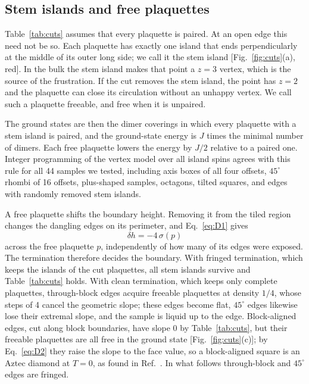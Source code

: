 \documentclass[reprint,aps,prb,floatfix,longbibliography,amsmath,amssymb]{revtex4-2}
\begin{document}
\subsection{Stem islands and free plaquettes}

Table~\ref{tab:cuts} assumes that every plaquette is paired. At an open edge this need not be so. Each plaquette has exactly one island that ends perpendicularly at the middle of its outer long side; we call it the stem island [Fig.~\ref{fig:cuts}(a), red]. In the bulk the stem island makes that point a $z=3$ vertex, which is the source of the frustration. If the cut removes the stem island, the point has $z=2$ and the plaquette can close its circulation without an unhappy vertex. We call such a plaquette freeable, and free when it is unpaired.

The ground states are then the dimer coverings in which every plaquette with a stem island is paired, and the ground-state energy is $J$ times the minimal number of dimers. Each free plaquette lowers the energy by $J/2$ relative to a paired one. Integer programming of the vertex model over all island spins agrees with this rule for all 44 samples we tested, including axis boxes of all four offsets, $45^\circ$ rhombi of 16 offsets, plus-shaped samples, octagons, tilted squares, and edges with randomly removed stem islands.

A free plaquette shifts the boundary height. Removing it from the tiled region changes the dangling edges on its perimeter, and Eq.~\eqref{eq:D1} gives
\begin{equation}\label{eq:D2}
  \delta h=-4\,\sigma(p)
\end{equation}
across the free plaquette $p$, independently of how many of its edges were exposed. The termination therefore decides the boundary. With fringed termination, which keeps the islands of the cut plaquettes, all stem islands survive and Table~\ref{tab:cuts} holds. With clean termination, which keeps only complete plaquettes, through-block edges acquire freeable plaquettes at density $1/4$, whose steps of 4 cancel the geometric slope; these edges become flat, $45^\circ$ edges likewise lose their extremal slope, and the sample is liquid up to the edge. Block-aligned edges, cut along block boundaries, have slope 0 by Table~\ref{tab:cuts}, but their freeable plaquettes are all free in the ground state [Fig.~\ref{fig:cuts}(c)]; by Eq.~\eqref{eq:D2} they raise the slope to the face value, so a block-aligned square is an Aztec diamond at $T=0$, as found in Ref.~\cite{KimVorticity}. In what follows through-block and $45^\circ$ edges are fringed.
\end{document}
